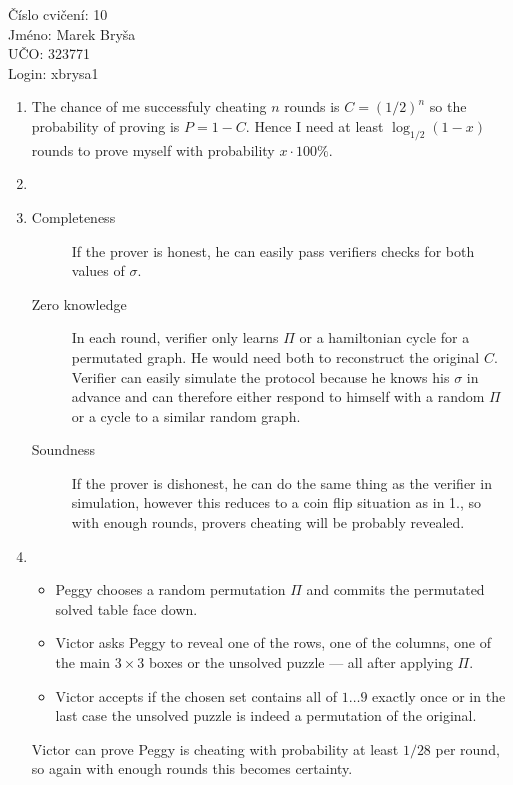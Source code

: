 \documentclass[a4paper,10pt]{extarticle}
\begin{document}
\begin{flushleft}
Číslo cvičení: 10 \\ 
Jméno: Marek Bryša \\
UČO: 323771\\
Login: xbrysa1\\
\end{flushleft}
\begin{enumerate}
  \item
    The chance of me successfuly cheating $n$ rounds is $C=(1/2)^n$ so the probability of proving is $P=1-C$. Hence I need at least $\log_{1/2}(1-x)$ rounds to prove myself with probability $x\cdot 100\%$.
  \item
  \item
    \begin{description}
      \item[Completeness]
        If the prover is honest, he can easily pass verifiers checks for both values of $\sigma$.
      \item[Zero knowledge]
        In each round, verifier only learns $\Pi$ or a hamiltonian cycle for a permutated graph. He would need both to reconstruct the original $C$. Verifier can easily simulate the protocol because he knows his $\sigma$ in advance and can therefore either respond to himself with a random $\Pi$ or a cycle to a similar random graph.
      \item[Soundness]
        If the prover is dishonest, he can do the same thing as the verifier in simulation, however this reduces to a coin flip situation as in 1., so with enough rounds, provers cheating will be probably revealed.
    \end{description}
  \item
    \begin{itemize}
      \item
        Peggy chooses a random permutation $\Pi$ and commits the permutated solved table face down.
      \item
        Victor asks Peggy to reveal one of the rows, one of the columns, one of the main $3\times 3$ boxes or the unsolved puzzle --- all after applying $\Pi$.
      \item
        Victor accepts if the chosen set contains all of $1\dots 9$ exactly once or in the last case the unsolved puzzle is indeed a permutation of the original.
    \end{itemize}
    Victor can prove Peggy is cheating with probability at least $1/28$ per round, so again with enough rounds this becomes certainty.
\end{enumerate}
\end{document}
